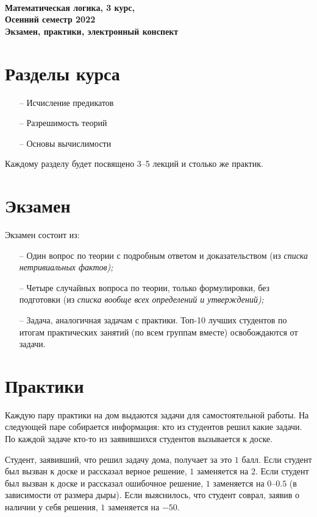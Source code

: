 \documentclass[a4paper,12pt]{article}
\begin{document}
\begin{center} {\LARGE\bf \ \\
	Математическая логика, 3 курс, \\
	Осенний семестр 2022 \\
	Экзамен, практики, электронный конспект \\}
\end{center}

\section{Разделы курса}
\begin{enumerate}
	\item[–] Исчисление предикатов
	\item[–] Разрешимость теорий
	\item[–] Основы вычислимости
\end{enumerate}

Каждому разделу будет посвящено 3–5 лекций и столько же практик.

\section{Экзамен}

Экзамен состоит из:

\begin{enumerate}
	\item[–] Один вопрос по теории с подробным ответом и доказательством (из {\it списка нетривиальных фактов);}
	\item[–] Четыре случайных вопроса по теории, только формулировки, без подготовки (из {\it списка вообще всех определений и утверждений);}
	\item[–] Задача, аналогичная задачам с практики. Топ-10 лучших студентов по итогам практических занятий (по всем группам вместе) освобождаются от задачи.
\end{enumerate}

\section{Практики}

	Каждую пару практики на дом выдаются задачи для самостоятельной работы. На следующей паре собирается информация: кто из студентов решил какие задачи. По каждой задаче кто-то из заявившихся студентов вызывается к доске.

	Студент, заявивший, что решил задачу дома, получает за это \(1\) балл. Если студент был вызван к доске и рассказал верное решение, \(1\) заменяется на \(2\). Если студент был вызван к доске и рассказал ошибочное решение, \(1\) заменяется на \(0\)–\(0.5\) (в зависимости от размера дыры). Если выяснилось, что студент соврал, заявив о наличии у себя решения, \(1\) заменяется на \(-50\).
\end{document}
